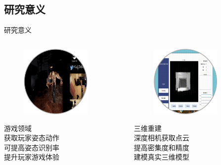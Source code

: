 \documentclass[aspectratio=169,12pt]{beamer}
\begin{document}
\subsection{研究意义}
\begin{frame}[t]
	\vspace*{-.2cm}
	\begin{center}
		研究意义	
	\end{center}
	\vspace{-.5cm}
	\begin{columns}
		\begin{column}{.30\linewidth}
			\begin{figure}
				\includegraphics[height=3.5cm]{3.png}
			\end{figure}
			\begin{center}
				游戏领域\\[0.5em]
				{\small 获取玩家姿态动作\\
				可提高姿态识别率\\
				提升玩家游戏体验\\}
			\end{center}
		\end{column}
		\begin{column}{.30\linewidth}
			\begin{figure}
				\includegraphics[height=3.5cm]{4.png}
			\end{figure}
			\begin{center}
				三维重建\\[0.5em]
				{\small 深度相机获取点云\\
				提高密集度和精度\\
				建模真实三维模型\\}
			\end{center}
		\end{column}

\end{columns}
\end{frame}
\end{document}
